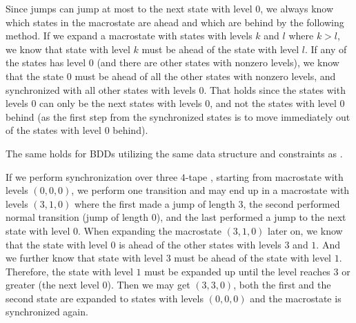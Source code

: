 Since jumps can jump at most to the next state with level $0$, we always know which states in the macrostate are ahead and which are behind by the following method.
If we expand a macrostate with states with levels $k$ and $l$ where $k > l$, we know that state with level $k$ must be ahead of the state with level $l$.
If any of the states has level $0$ (and there are other states with nonzero levels), we know that the state $0$ must be ahead of all the other states with nonzero levels, and synchronized with all other states with levels $0$.
That holds since the states with levels $0$ can only be the next states with levels $0$, and not the states with level $0$ behind (as the first step from the synchronized states is to move immediately out of the states with level $0$ behind).

The same holds for BDDs utilizing the same data structure and constraints as \nfts.

\begin{example}
  If we perform synchronization over three $4$-tape \nfts, starting from macrostate with levels $(0, 0, 0)$, we perform one transition and may end up in a macrostate with levels $(3, 1, 0)$ where the first \nft made a jump of length $3$, the second performed normal transition (jump of length $0$), and the last \nft performed a jump to the next state with level $0$.
  When expanding the macrostate $(3, 1, 0)$ later on, we know that the state with level $0$ is ahead of the other states with levels $3$ and $1$. And we further know that state with level $3$ must be ahead of the state with level $1$. Therefore, the state with level $1$ must be expanded up until the level reaches $3$ or greater (the next level $0$).
  Then we may get $(3, 3, 0)$, both the first and the second state are expanded to states with levels $(0, 0, 0)$ and the macrostate is synchronized again.
\end{example}

